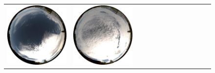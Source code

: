 \documentclass{report}
\begin{document}
\begin{figure}[!th]
\begin{tabular}{@{}rcccccccccccc@{}}
    \includegraphics[width=\customwidth]{./figures/database/20131106_135932.jpg} &
    \includegraphics[width=\customwidth]{./figures/database/20131106_142922.jpg} &

\end{tabular}
\end{figure}
\end{document}
